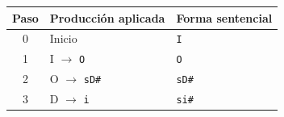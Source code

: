 \begin{tabular}{|c|l|l|}\hline
\rowcolor{cabecera}\textbf{Paso}&\textbf{Producción aplicada}&\textbf{Forma sentencial}\\\hline
0 & Inicio & \texttt{I} \\
1 & I $\to$ \texttt{O} & \texttt{O} \\
2 & O $\to$ \texttt{sD\#} & \texttt{sD\#} \\
3 & D $\to$ \texttt{i} & \texttt{si\#} \\
\hline\end{tabular}
